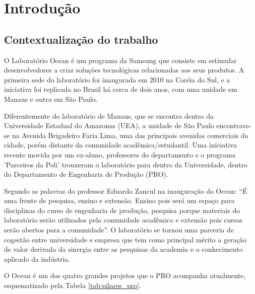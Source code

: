 \chapter[Introdução]{Introdução}
\label{chap:introducao}
\section{Contextualização do trabalho}
\label{cha:contexto}

O Laboratório Ocean é um programa da Samsung que consiste em estimular desenvolvedores a criar soluções tecnológicas relacionadas aos seus produtos. A primeira sede do laboratório foi inaugurada em 2010 na Coréia do Sul, e a iniciativa foi replicada no Brasil há cerca de dois anos, com uma unidade em Manaus e outra em São Paulo.

Diferentemente do laboratório de Manaus, que se encontra dentro da Universidade Estadual do Amazonas (UEA), a unidade de São Paulo encontrava-se na Avenida Brigadeiro Faria Lima, uma das principais avenidas comerciais da cidade, porém distante da comunidade acadêmica/estudantil. Uma iniciativa recente movida por um ex-aluno, professores do departamento e o programa 'Parceiros da Poli' trouxeram o laboratório para dentro da Universidade, dentro do Departamento de Engenharia de Produção (PRO).

Segundo as palavras do professor Eduardo Zancul na inauguração do Ocean: “É uma frente de pesquisa, ensino e extensão. Ensino pois será um espaço para disciplinas do curso de engenharia de produção, pesquisa porque materiais do laboratório serão utilizados pela comunidade acadêmica e extensão pois cursos serão abertos para a comunidade”. O laboratório se tornou uma parceria de cogestão entre universidade e empresa que tem como principal mérito a geração de valor derivada da sinergia entre as pesquisas da academia e o conhecimento aplicado da indústria. 

O Ocean é um dos quatro grandes projetos que o PRO acompanha atualmente, esquematizado pela Tabela \ref{tab:pilares_pro}.

